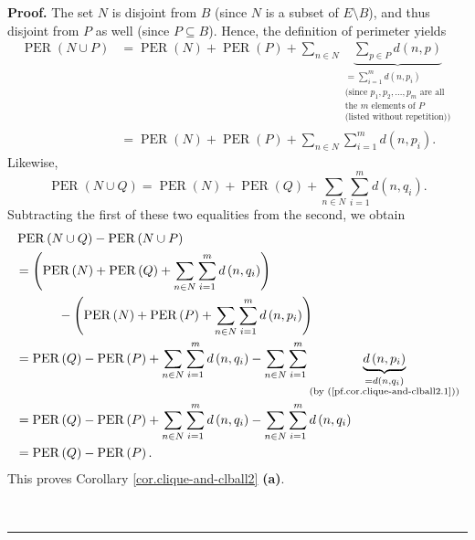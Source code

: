\documentclass[numbers=enddot,12pt,final,onecolumn,notitlepage]{scrartcl}%
\theoremstyle{definition}
\newenvironment{proof}[1][Proof]{\noindent\textbf{#1.} }{\ \rule{0.5em}{0.5em}}
\let\sumnonlimits\sum
\renewcommand{\sum}{\sumnonlimits\limits}
\theoremstyle{plainsl}
\begin{document}
\begin{proof}
The set $N$ is disjoint from $B$ (since $N$ is a subset of $E\setminus B$),
and thus disjoint from $P$ as well (since $P\subseteq B$). Hence, the
definition of perimeter yields%
\begin{align*}
\operatorname*{PER}\left(  N\cup P\right)   &  =\operatorname*{PER}\left(
N\right)  +\operatorname*{PER}\left(  P\right)  +\sum_{n\in N}\underbrace{\sum
_{p\in P}d\left(  n,p\right)  }_{\substack{=\sum_{i=1}^{m}d\left(
n,p_{i}\right)  \\\text{(since }p_{1},p_{2},\ldots,p_{m}\text{ are
all}\\\text{the }m\text{ elements of }P\\\text{(listed without repetition))}%
}}\\
&  =\operatorname*{PER}\left(  N\right)  +\operatorname*{PER}\left(  P\right)
+\sum_{n\in N}\sum_{i=1}^{m}d\left(  n,p_{i}\right)  .
\end{align*}
Likewise,%
\[
\operatorname*{PER}\left(  N\cup Q\right)  =\operatorname*{PER}\left(
N\right)  +\operatorname*{PER}\left(  Q\right)  +\sum_{n\in N}\sum_{i=1}%
^{m}d\left(  n,q_{i}\right)  .
\]
Subtracting the first of these two equalities from the second, we obtain%
\begin{align*}
&  \operatorname*{PER}\left(  N\cup Q\right)  -\operatorname*{PER}\left(
N\cup P\right) \\
&  =\left(  \operatorname*{PER}\left(  N\right)  +\operatorname*{PER}\left(
Q\right)  +\sum_{n\in N}\sum_{i=1}^{m}d\left(  n,q_{i}\right)  \right) \\
&  \ \ \ \ \ \ \ \ \ \ -\left(  \operatorname*{PER}\left(  N\right)
+\operatorname*{PER}\left(  P\right)  +\sum_{n\in N}\sum_{i=1}^{m}d\left(
n,p_{i}\right)  \right) \\
&  =\operatorname*{PER}\left(  Q\right)  -\operatorname*{PER}\left(  P\right)
+\sum_{n\in N}\sum_{i=1}^{m}d\left(  n,q_{i}\right)  -\sum_{n\in N}\sum
_{i=1}^{m}\underbrace{d\left(  n,p_{i}\right)  }_{\substack{=d\left(
n,q_{i}\right)  \\\text{(by (\ref{pf.cor.clique-and-clball2.1}))}}}\\
&  =\operatorname*{PER}\left(  Q\right)  -\operatorname*{PER}\left(  P\right)
+\sum_{n\in N}\sum_{i=1}^{m}d\left(  n,q_{i}\right)  -\sum_{n\in N}\sum
_{i=1}^{m}d\left(  n,q_{i}\right) \\
&  =\operatorname*{PER}\left(  Q\right)  -\operatorname*{PER}\left(  P\right)
.
\end{align*}
This proves Corollary \ref{cor.clique-and-clball2} \textbf{(a)}. \medskip


\end{proof}
\end{document}
